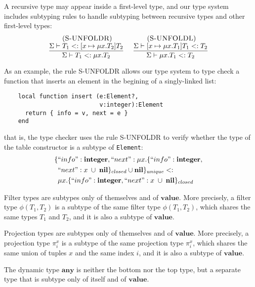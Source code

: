 \documentclass{sigplanconf}
\newcommand{\Value}{\mathbf{value}}
\newcommand{\Any}{\mathbf{any}}
\newcommand{\Nil}{\mathbf{nil}}
\newcommand{\Integer}{\mathbf{integer}}
\newcommand{\mylabel}[1]{\; (\textsc{#1})}
\newcommand{\senv}{\Sigma}
\newcommand{\subtype}{<:}
\begin{document}
A recursive type may appear inside a first-level type, and our
type system includes subtyping rules to handle subtyping between
recursive types and other first-level types:
\[
\begin{array}{c}
\begin{array}{c}
\mylabel{S-UNFOLDR}\\
\dfrac{\senv \vdash T_{1} \subtype [x \mapsto \mu x.T_{2}]T_{2}}
      {\senv \vdash T_{1} \subtype \mu x.T_{2}}
\end{array}
\;
\begin{array}{c}
\mylabel{S-UNFOLDL}\\
\dfrac{\senv \vdash [x \mapsto \mu x.T_{1}]T_{1} \subtype T_{2}}
      {\senv \vdash \mu x.T_{1} \subtype T_{2}}
\end{array}
\end{array}
\]

As an example, the rule \textsc{S-UNFOLDR} allows our type system to
type check a function that inserts an element in the begining of
a singly-linked list:
\begin{verbatim}
    local function insert (e:Element?,
                           v:integer):Element
      return { info = v, next = e }
    end
\end{verbatim}
that is, the type checker uses the rule \textsc{S-UNFOLDR} to verify whether
the type of the table constructor is a subtype of \texttt{Element}:
\begin{align*}
\{ & ``info":\Integer, ``next":\mu x.\{ ``info":\Integer, \\
   & ``next":x \;\cup\; \Nil\}_{closed} \cup \Nil \}_{unique} \subtype \\
& \mu x.\{``info":\Integer, ``next":x \;\cup\; \Nil\}_{closed}
\end{align*}

Filter types are subtypes only of themselves and of $\Value$.
More precisely, a filter type $\phi(T_{1},T_{2})$ is a subtype of
the same filter type $\phi(T_{1},T_{2})$, which shares the same
types $T_{1}$ and $T_{2}$, and it is also a subtype of $\Value$.

Projection types are subtypes only of themselves and of $\Value$.
More precisely, a projection type $\pi_{i}^{x}$ is a subtype of the
same projection type $\pi_{i}^{x}$, which shares the same union of
tuples $x$ and the same index $i$, and it is also a subtype of $\Value$.

The dynamic type $\Any$ is neither the bottom nor the top type,
but a separate type that is subtype only of itself and of $\Value$.
\end{document}
